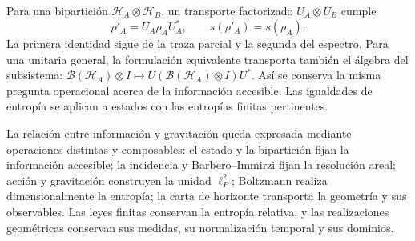 Para una bipartición \(\mathcal H_A\otimes\mathcal H_B\), un
transporte factorizado \(U_A\otimes U_B\) cumple
\[
 \rho'_A=U_A\rho_AU_A^*,\qquad s(\rho'_A)=s(\rho_A).
\]
La primera identidad sigue de la traza parcial y la segunda del espectro.
Para una unitaria general, la formulación equivalente transporta también
el álgebra del subsistema:
\(\mathcal B(\mathcal H_A)\otimes I\mapsto
U(\mathcal B(\mathcal H_A)\otimes I)U^*\).
Así se conserva la misma pregunta operacional acerca de la información
accesible. Las igualdades de entropía se aplican a estados con las entropías
finitas pertinentes.

La relación entre información y gravitación queda expresada mediante
operaciones distintas y composables: el estado y la bipartición fijan la
información accesible; la incidencia y Barbero--Immirzi fijan la resolución
areal; acción y gravitación construyen la unidad \(\ell_P^2\);
Boltzmann realiza dimensionalmente la entropía; la carta de horizonte
transporta la geometría y sus observables. Las leyes finitas conservan la
entropía relativa, y las realizaciones geométricas conservan sus medidas,
su normalización temporal y sus dominios.
